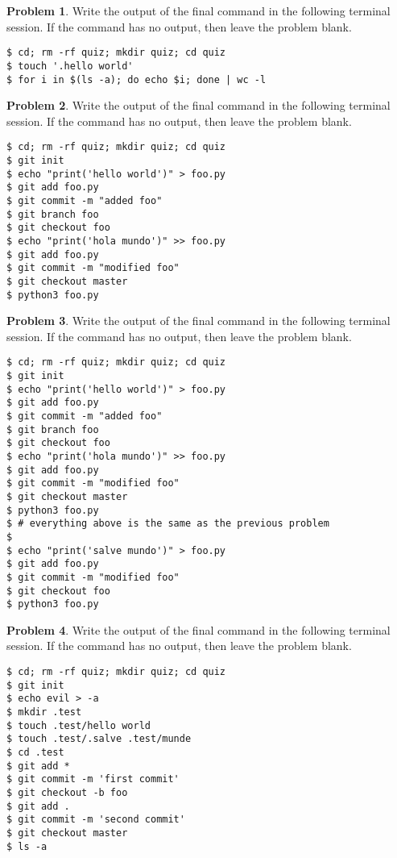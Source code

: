 \documentclass[10pt]{article}
\theoremstyle{definition}
\newtheorem{problem}{Problem}
\begin{document}
\begin{problem}
    Write the output of the final command in the following terminal session.
    If the command has no output, then leave the problem blank.
\end{problem}
\begin{lstlisting}
$ cd; rm -rf quiz; mkdir quiz; cd quiz
$ touch '.hello world'
$ for i in $(ls -a); do echo $i; done | wc -l
\end{lstlisting}
\vspace{1in}

\newpage

\begin{problem}
    Write the output of the final command in the following terminal session.
    If the command has no output, then leave the problem blank.
\end{problem}
\begin{lstlisting}
$ cd; rm -rf quiz; mkdir quiz; cd quiz
$ git init
$ echo "print('hello world')" > foo.py
$ git add foo.py
$ git commit -m "added foo"
$ git branch foo
$ git checkout foo
$ echo "print('hola mundo')" >> foo.py
$ git add foo.py
$ git commit -m "modified foo"
$ git checkout master
$ python3 foo.py
\end{lstlisting}

\vspace{1in}
\begin{problem}
    Write the output of the final command in the following terminal session.
    If the command has no output, then leave the problem blank.
\end{problem}
\begin{lstlisting}
$ cd; rm -rf quiz; mkdir quiz; cd quiz
$ git init
$ echo "print('hello world')" > foo.py
$ git add foo.py
$ git commit -m "added foo"
$ git branch foo
$ git checkout foo
$ echo "print('hola mundo')" >> foo.py
$ git add foo.py
$ git commit -m "modified foo"
$ git checkout master
$ python3 foo.py
$ # everything above is the same as the previous problem
$
$ echo "print('salve mundo')" > foo.py
$ git add foo.py
$ git commit -m "modified foo"
$ git checkout foo
$ python3 foo.py
\end{lstlisting}


\newpage
\filbreak
\begin{problem}
    Write the output of the final command in the following terminal session.
    If the command has no output, then leave the problem blank.
\end{problem}
\begin{lstlisting}
$ cd; rm -rf quiz; mkdir quiz; cd quiz
$ git init
$ echo evil > -a
$ mkdir .test
$ touch .test/hello world
$ touch .test/.salve .test/munde
$ cd .test
$ git add *
$ git commit -m 'first commit'
$ git checkout -b foo
$ git add .
$ git commit -m 'second commit'
$ git checkout master
$ ls -a
\end{lstlisting}
\vspace{1in}
\end{document}
